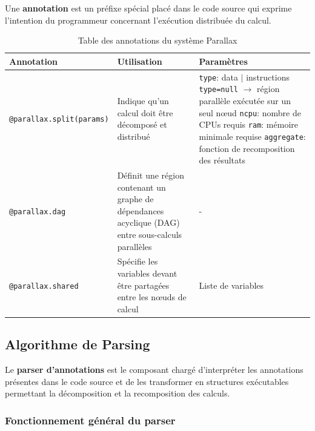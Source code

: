 \documentclass[12pt,a4paper]{report}
\theoremstyle{definition}
\begin{document}
Une \textbf{annotation} est un préfixe spécial placé dans le code source qui exprime l'intention du programmeur concernant l'exécution distribuée du calcul.
\begin{table}[H]
\centering
\renewcommand{\arraystretch}{1.3}

\begin{tabular}{|p{5cm}|p{3cm}|p{5cm}|}
\hline
\textbf{Annotation} & \textbf{Utilisation} & \textbf{Paramètres} \\
\hline

\texttt{@parallax.split(params)} 
& Indique qu'un calcul doit être décomposé et distribué 
& 
\texttt{type}: data $|$ instructions \newline
\texttt{type=null} $\rightarrow$ région parallèle exécutée sur un seul nœud \newline
\texttt{ncpu}: nombre de CPUs requis \newline
\texttt{ram}: mémoire minimale requise \newline
\texttt{aggregate}: fonction de recomposition des résultats \\
\hline

\texttt{@parallax.dag} 
& Définit une région contenant un graphe de dépendances acyclique (DAG) entre sous-calculs parallèles 
& - \\
\hline

\texttt{@parallax.shared} 
& Spécifie les variables devant être partagées entre les nœuds de calcul 
& Liste de variables \\
\hline

\end{tabular}

\caption{Table des annotations du système Parallax}
\label{tab:annotations}
\end{table}

\subsection{Algorithme de Parsing}

Le \textbf{parser d'annotations} est le composant chargé d'interpréter les annotations présentes dans le code source et de les transformer en structures exécutables permettant la décomposition et la recomposition des calculs.


\subsubsection{Fonctionnement général du parser}
\end{document}

